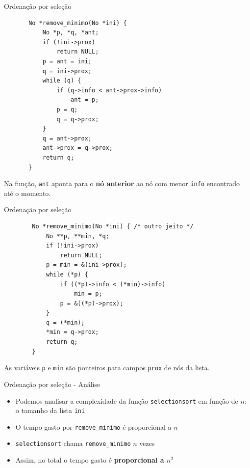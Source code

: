 \documentclass{beamer}
\newcommand{\cod}[1]{\texttt{#1}}
\begin{document}
\begin{frame}[fragile]{Ordenação por seleção}

    \vspace{-1.5em}
    \begin{verbatim}
       No *remove_minimo(No *ini) {
           No *p, *q, *ant;
           if (!ini->prox)
               return NULL;
           p = ant = ini;
           q = ini->prox;
           while (q) {
               if (q->info < ant->prox->info)
                   ant = p;
               p = q;
               q = q->prox;
           }
           q = ant->prox;
           ant->prox = q->prox;
           return q;
       }
    \end{verbatim}

    \vspace{-1em}
    Na função, \cod{ant} aponta para o \textbf{nó anterior} ao nó com menor \cod{info} encontrado até o momento.
\end{frame}

\begin{frame}[fragile]{Ordenação por seleção}

    \begin{verbatim}
        No *remove_minimo(No *ini) { /* outro jeito */
            No **p, **min, *q;
            if (!ini->prox)
                return NULL;
            p = min = &(ini->prox);
            while (*p) {
                if ((*p)->info < (*min)->info)
                    min = p;
                p = &((*p)->prox);
            }
            q = (*min);
            *min = q->prox;
            return q;
        }
    \end{verbatim}

    As variáveis \cod{p} e \cod{min} são ponteiros para campos \cod{prox} de nós da lista.
\end{frame}

\begin{frame}[fragile]{Ordenação por seleção - Análise}

    \begin{itemize}
        \item Podemos analisar a complexidade da função \cod{selectionsort} em função de $n$: o tamanho da lista \cod{ini}
        \item O tempo gasto por \cod{remove_minimo} é proporcional a $n$
        \item \cod{selectionsort} chama \cod{remove_minimo} $n$ vezes
        \item Assim, no total o tempo gasto é \textbf{proporcional a $n^2$}
    \end{itemize}

\end{frame}
\end{document}
